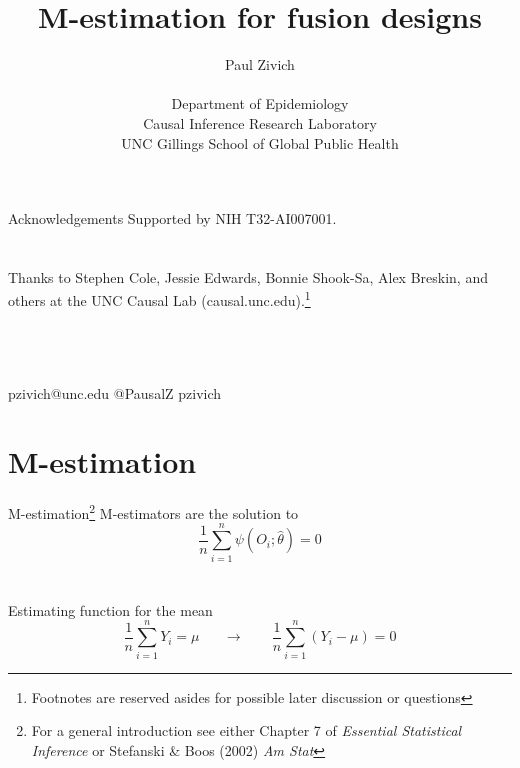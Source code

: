 \documentclass{beamer}
\title{M-estimation for fusion designs}
\author[Paul Zivich]{Paul Zivich \\~\\ Department of Epidemiology \\ Causal Inference Research Laboratory \\ UNC Gillings School of Global Public Health}
\begin{document}
	\begin{frame}[plain]
		\maketitle
\end{frame}

\begin{frame}{Acknowledgements}
	Supported by NIH T32-AI007001.\\~\\~\\
	
	Thanks to Stephen Cole, Jessie Edwards, Bonnie Shook-Sa, Alex Breskin, and others at the UNC Causal Lab (causal.unc.edu).\footnote[frame]{Footnotes are reserved asides for possible later discussion or questions}\\~\\~\\~\\
	\begin{center}
		\faEnvelope \quad pzivich@unc.edu \qquad
		\faTwitter \quad @PausalZ \qquad
		\faGithub \quad pzivich\\
	\end{center}
\end{frame}

\section{M-estimation}

\begin{frame}{M-estimation\footnote[frame]{For a general introduction see either Chapter 7 of \textit{Essential Statistical Inference} or Stefanski \& Boos (2002) \textit{Am Stat}}}
	M-estimators are the solution to
	\[\frac{1}{n} \sum_{i=1}^{n} \psi(O_i; \hat{\theta}) = 0\]~\\~\\
	Estimating function for the mean
	\[\frac{1}{n} \sum_{i=1}^{n} Y_i = \mu \;\;\;\;\;\; \rightarrow \;\;\;\;\;\;\; \frac{1}{n} \sum_{i=1}^{n} (Y_i - \mu) = 0\]
\end{frame}

\end{document}
